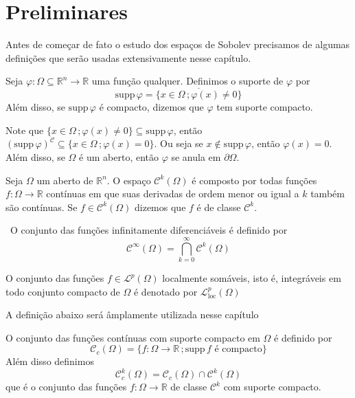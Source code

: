 \documentclass[a4paper, 11pt]{book}
\theoremstyle{definition}
\newcommand{\obs}{\noindent{\textbf{\textcolor{black}{\sffamily Observação:}}}~}
\newcommand{\bR}{\mathbb{R}}
\newcommand{\cC}{\mathcal{C}}
\newcommand{\cL}{\mathcal{L}}
\newcommand{\supp}{\mathrm{supp}\,}
\begin{document}
\section{Preliminares}

Antes de começar de fato o estudo dos espaços de Sobolev precisamos de algumas definições que serão usadas extensivamente nesse capítulo.

\begin{dbox} \label{def:suporte}
    Seja $\varphi : \Omega \subseteq \bR ^n \to \bR$ uma função qualquer. Definimos o suporte de $\varphi$ por
    \[
        \supp \varphi = \overline{\{x \in \Omega \,; \varphi(x) \neq 0\}}
    \]
    Além disso, se $\supp\varphi$ é compacto, dizemos que $\varphi$ tem suporte compacto.
\end{dbox}

Note que $\{x \in \Omega \,; \varphi(x) \neq 0\} \subseteq \supp \varphi$, então $(\supp \varphi)^\cC \subseteq \{x \in \Omega \,; \varphi(x) = 0\}$. Ou seja se $x \not\in \supp \varphi$, então $\varphi(x) = 0$.
Além disso, se $\Omega$ é um aberto, então $\varphi$ se anula em $\partial\Omega$.

\begin{dbox}
    Seja $\Omega$ um aberto de $\bR^n$. O espaço $\cC^k(\Omega)$ é composto por todas funções $f : \Omega \to \bR$ contínuas em que suas derivadas de ordem menor ou igual a $k$ também são contínuas.
    Se $f \in \cC^k(\Omega)$ dizemos que $f$ é de classe $\cC^k$.
\end{dbox}

\obs O conjunto das funções infinitamente diferenciáveis é definido por
\[
    \cC^\infty(\Omega) = \bigcap_{k=0}^\infty \cC^k(\Omega)
\]

\begin{dbox}
    O conjunto das funções $f \in \cL^p(\Omega)$ localmente somáveis, isto é, integráveis em todo conjunto compacto de $\Omega$ é denotado por $\cL^p_{\mathrm{loc}}(\Omega)$ 
\end{dbox}

A definição abaixo será âmplamente utilizada nesse capítulo

\begin{dbox}
    O conjunto das funções contínuas com suporte compacto em $\Omega$ é definido por
    \[
        \cC_c(\Omega) = \{f : \Omega \to \bR \,; \supp f \text{ é compacto}\}
    \]
    Além disso definimos
    \[
        \cC^k_c(\Omega) = \cC_c(\Omega) \cap \cC^k(\Omega)
    \]
    que é o conjunto das funções $f : \Omega \to \bR$ de classe $\cC^k$ com suporte compacto.
\end{dbox}
\end{document}
